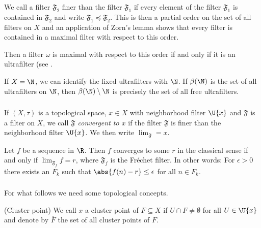 \documentclass[%
	,english 
	,headings	= small 
	,leqno
	,parskip		= half+
	,DIV			= 14
	,BCOR 			= 10mm	
		]{scrartcl}
\begin{document}
\begin{multicols}{2}
\begin{myenumerate}
\end{myenumerate}
%
\begin{remark}
We call a filter $ \mathfrak{F}_{ 2 } $ finer than the filter $ \mathfrak{F}_{ 1 } $ if every element of the filter $ \mathfrak{F}_{ 1 } $ is contained in $ \mathfrak{F}_{ 2 } $ and write $ \mathfrak{F}_{ 1 } \preccurlyeq \mathfrak{F}_{ 2 } $.
This is then a partial order on the set of all filters on $ X $ and an application of Zorn's lemma shows that every filter is contained in a maximal filter with respect to this order.

Then a filter $ \omega $ is maximal with respect to this order if and only if it is an ultrafilter
(see \textcite[Chap. I, §6.4 Prop. 5]{bourbaki:topology-1}.

\end{remark}

%
%
\begin{example}
If $ X = \N $, we can identify the fixed ultrafilters with $ \N $.
If $ \beta( \N ) $ is the set of all ultrafilters on $ \N $, then $ \beta( \N ) \setminus \N $ is precisely the set of all free ultrafilters. 
\end{example}
%
\subsubsection{}
If $ ( X , \tau ) $ is a topological space, $ x \in X $ with neighborhood filter $ \U{x} $ and $ \mathfrak{F} $ is a filter on $ X $, we call \emph{$ \mathfrak{F} $ convergent to $ x $} if the filter $ \mathfrak{F} $ is finer than the neighborhood filter $ \U{x} $.
We then write $ \lim_{ \mathfrak{F} } = x $.
%
\begin{example}
Let $ f $ be a sequence in $ \R $.
Then $ f $ converges to some $ r $ in the classical sense if and only if $ \lim_{ \mathfrak{F}_{ f } } f = r $, where $ \mathfrak{F}_{ f } $ is the Fréchet filter.
In other words: For $ \epsilon > 0 $ there exists an $ F_{ k } $ such that $ \abs{ f(n) - r } \leq \epsilon $ for all $ n \in F_{ k } $.
\end{example}
%
\subsubsection{}
For what follows we need some topological concepts.

\begin{myenumerate}
	\item (Cluster point)
	 We call $ x $ a cluster point of $ F \subseteq X $ if $ U \cap F \neq \emptyset $ for all $ U \in \U{ x } $ and denote by $ \overline{F} $ the set of all cluster points of $ F $.
	

\end{myenumerate}
\end{multicols}
\end{document}

